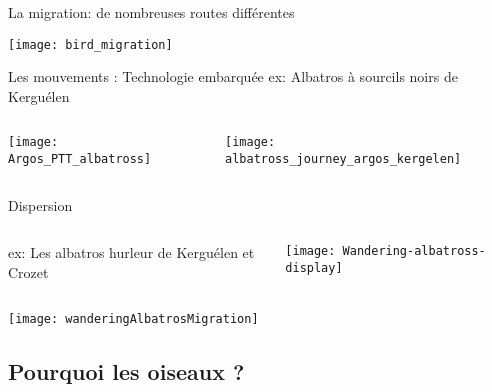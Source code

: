 \message{ !name(cours_DIE_ONIRIS_Suivi_populations_oiseaux.tex)}\documentclass[10pt]{beamer}
\begin{document}
\begin{frame}{La migration: de nombreuses routes différentes}
  \begin{center}
    \texttt{[image: bird\_migration]} 
  \end{center}
\end{frame}


\begin{frame}{Les mouvements : Technologie embarquée}
  ex: Albatros à sourcils noirs de Kerguélen
  \begin{columns}[c]
    \begin{column}[c]{0.4\textwidth}
      \begin{center}
        \texttt{[image: Argos\_PTT\_albatross]}
      \end{center}
    \end{column}
    \begin{column}[c]{0.6\textwidth}
      \begin{center}
        \texttt{[image: albatross\_journey\_argos\_kergelen]}
      \end{center}
    \end{column}
  \end{columns}
\end{frame}




\begin{frame}{Dispersion}
  \begin{columns}[c]
    \begin{column}[c]{0.75\textwidth}
      ex: Les albatros hurleur de Kerguélen et Crozet
    \end{column}
    \begin{column}[c]{0.25\textwidth}
      \texttt{[image: Wandering-albatross-display]} 
    \end{column}
  \end{columns}
  \begin{center}
    \texttt{[image: wanderingAlbatrosMigration]} 
  \end{center}
\end{frame}


\subsection{Pourquoi les oiseaux ?} 
\end{document}
